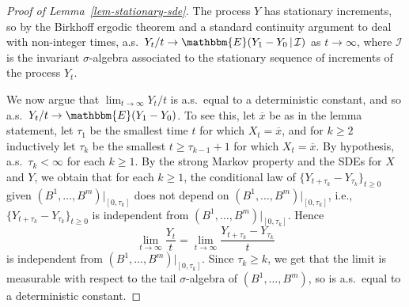 \documentclass[11pt]{article}
\theoremstyle{plain}
\theoremstyle{definition}
\numberwithin{equation}{section}
\newcommand{\eqbn}{\begin{equation*}}
\newcommand{\eqen}{\end{equation*}}
\newcommand{\BB}{\mathbbm}
\newcommand{\ol}{\overline}
\newcommand{\ep}{\varepsilon}
\newcommand{\rta}{\rightarrow}
\newcommand{\mcl}{\mathcal}
\let\originalleft\left
\let\originalright\right
\renewcommand{\left}{\mathopen{}\mathclose\bgroup\originalleft}
\renewcommand{\right}{\aftergroup\egroup\originalright}
\begin{document}
\begin{proof}[Proof of Lemma~\ref{lem-stationary-sde}]
The process $Y$ has stationary increments, so by the Birkhoff ergodic theorem and a standard continuity argument to deal with non-integer times, a.s.\ 
$Y_t/t \rta \BB{E}\left( Y_1 - Y_0\,|\, \mcl I\right)$ as $t \rta \infty$, 
where $\mcl I$ is the invariant $\sigma$-algebra associated to the stationary sequence of increments of the process $Y_t$.  

We now argue that $\lim_{t\to\infty} Y_t/t$ is a.s.\ equal to a deterministic constant, and so a.s.\ $Y_t/t \rta \BB{E}(Y_1-Y_0)$. To see this, let $\ol x$ be as in the lemma statement, let $\tau_1$ be the smallest time $t$ for which $X_t  = \ol x$, and for $k\geq 2$ inductively let $\tau_k$ be the smallest $t\geq \tau_{k-1} + 1$ for which $X_t = \ol x$. By hypothesis, a.s.\ $\tau_k<\infty$ for each $k\geq 1$. 
By the strong Markov property and the SDEs for $X$ and $Y$, we obtain that for each $k\geq 1$, the conditional law of $\{Y_{t+\tau_k} - Y_{\tau_k}\}_{t \geq 0}$ given $(B^1,\dots,B^m)|_{[0,\tau_k]}$ does not depend on $(B^1,\dots,B^m)|_{[0,\tau_k]}$, i.e., $\{Y_{t+\tau_k} - Y_{\tau_k}\}_{t \geq 0}$ is independent from $(B^1,\dots,B^m)|_{[0,\tau_k]}$. 
Hence
\eqbn
\lim_{t\to\infty} \frac{Y_t }{t} = \lim_{t\to\infty} \frac{Y_{t+\tau_k} - Y_{\tau_k}}{t} 
\eqen
is independent from $(B^1,\dots,B^m)|_{[0,\tau_k]}$. Since $\tau_k \geq k$, we get that the limit is measurable with respect to the tail $\sigma$-algebra of $(B^1,\dots,B^m)$, so is a.s.\ equal to a deterministic constant. 


\end{proof}
\end{document}
